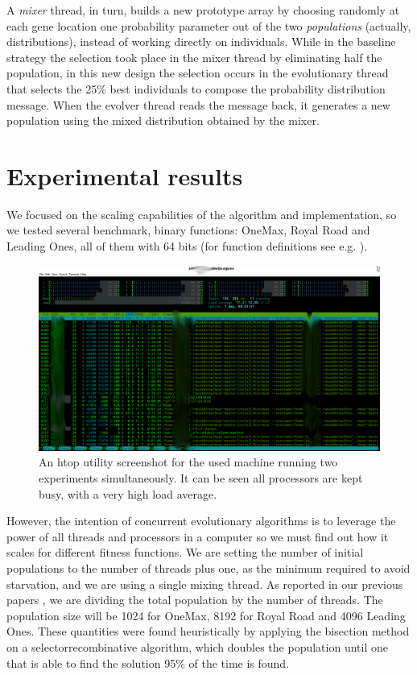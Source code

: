 \documentclass[runningheads]{llncs}\usepackage[]{graphicx}\usepackage[]{color}
\begin{document}
A {\em mixer} thread, in turn, 
builds a new prototype array by choosing randomly at each gene location
one probability parameter out of the  two {\em populations} (actually, distributions), 
instead of working directly on individuals. While in the baseline strategy the
selection took place in the mixer thread by eliminating half the
population, in this new design the selection occurs in the evolutionary thread
that selects the 25\% best individuals to compose the probability distribution
message. When the evolver thread reads the message back, it generates a new population 
using the mixed distribution obtained by the mixer.

\section{Experimental results}
\label{sec:exp}

We focused on the scaling capabilities of the algorithm
and implementation, so we tested several benchmark, binary functions:
OneMax, Royal Road and Leading Ones, all of them with 64 bits (for function definitions see e.g. \cite{rojas2012memory}). 

\begin{figure}[h!tb]
  \centering
\includegraphics[width=.99\textwidth]{../figure/screenshot}
\caption{An htop utility screenshot for the used machine running
  two experiments simultaneously. It can be seen all processors
  are kept busy, with a very high load average. }
\label{fig:screenshot}
\end{figure}
%
However, the intention of concurrent evolutionary algorithms is to
leverage the power of all threads and processors in a computer 
so we must find out how it scales for different fitness functions. 
We are setting the number of initial populations to the
number of threads plus one, as the minimum required to avoid
starvation, and we are using a single mixing thread. 
As reported in our previous papers %
\cite{Merelo:2018:MEA:3205651.3208317,Garcia-Valdez:2018:MEA:3205651.3205719},
we are dividing the total population by the number of threads. 
The population size will be 1024 for OneMax, 8192 for Royal Road 
and 4096 Leading Ones. These quantities were found heuristically 
by applying the bisection method on a selectorrecombinative algorithm, 
which doubles the population until one that is able to find 
the solution 95\% of the time is found.
\end{document}
